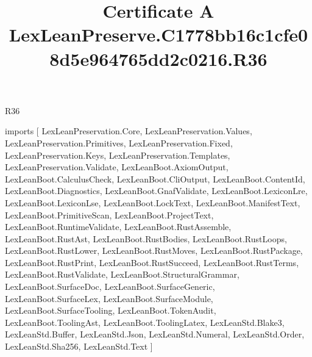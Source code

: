 \begin{lexlean}{R36}
\title{Certificate A LexLeanPreserve.C1778bb16c1cfe08d5e964765dd2c0216.R36}
\begin{coremodule}
imports [
  LexLeanPreservation.Core,
  LexLeanPreservation.Values,
  LexLeanPreservation.Primitives,
  LexLeanPreservation.Fixed,
  LexLeanPreservation.Keys,
  LexLeanPreservation.Templates,
  LexLeanPreservation.Validate,
  LexLeanBoot.AxiomOutput,
  LexLeanBoot.CalculusCheck,
  LexLeanBoot.CliOutput,
  LexLeanBoot.ContentId,
  LexLeanBoot.Diagnostics,
  LexLeanBoot.GnafValidate,
  LexLeanBoot.LexiconLre,
  LexLeanBoot.LexiconLse,
  LexLeanBoot.LockText,
  LexLeanBoot.ManifestText,
  LexLeanBoot.PrimitiveScan,
  LexLeanBoot.ProjectText,
  LexLeanBoot.RuntimeValidate,
  LexLeanBoot.RustAssemble,
  LexLeanBoot.RustAst,
  LexLeanBoot.RustBodies,
  LexLeanBoot.RustLoops,
  LexLeanBoot.RustLower,
  LexLeanBoot.RustMoves,
  LexLeanBoot.RustPackage,
  LexLeanBoot.RustPrint,
  LexLeanBoot.RustSucceed,
  LexLeanBoot.RustTerms,
  LexLeanBoot.RustValidate,
  LexLeanBoot.StructuralGrammar,
  LexLeanBoot.SurfaceDoc,
  LexLeanBoot.SurfaceGeneric,
  LexLeanBoot.SurfaceLex,
  LexLeanBoot.SurfaceModule,
  LexLeanBoot.SurfaceTooling,
  LexLeanBoot.TokenAudit,
  LexLeanBoot.ToolingAst,
  LexLeanBoot.ToolingLatex,
  LexLeanStd.Blake3,
  LexLeanStd.Buffer,
  LexLeanStd.Json,
  LexLeanStd.Numeral,
  LexLeanStd.Order,
  LexLeanStd.Sha256,
  LexLeanStd.Text
]


\end{coremodule}
\end{lexlean}
